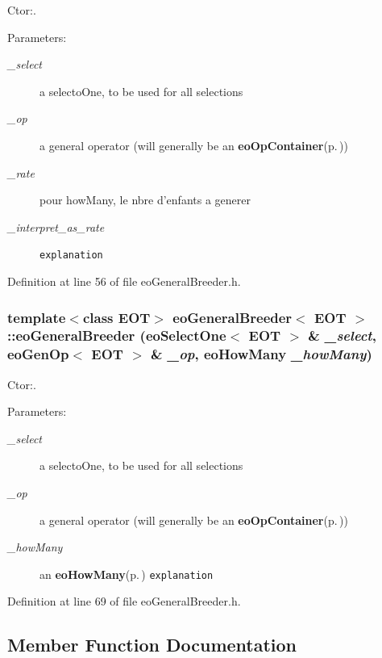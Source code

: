 Ctor:. 

\begin{Desc}
\item[Parameters:]
\begin{description}
\item[{\em \_\-select}]a selecto\-One, to be used for all selections \item[{\em \_\-op}]a general operator (will generally be an {\bf eo\-Op\-Container}{\rm (p.\,\pageref{classeo_op_container})}) \item[{\em \_\-rate}]pour how\-Many, le nbre d'enfants a generer \item[{\em \_\-interpret\_\-as\_\-rate}]{\tt explanation} \end{description}
\end{Desc}


Definition at line 56 of file eo\-General\-Breeder.h.
\subsubsection{\setlength{\rightskip}{0pt plus 5cm}template$<$class EOT$>$ {\bf eo\-General\-Breeder}$<$ {\bf EOT} $>$::{\bf eo\-General\-Breeder} ({\bf eo\-Select\-One}$<$ {\bf EOT} $>$ \& {\em \_\-select}, {\bf eo\-Gen\-Op}$<$ {\bf EOT} $>$ \& {\em \_\-op}, {\bf eo\-How\-Many} {\em \_\-how\-Many})\hspace{0.3cm}{\tt  [inline]}}\label{classeo_general_breeder_a1}


Ctor:. 

\begin{Desc}
\item[Parameters:]
\begin{description}
\item[{\em \_\-select}]a selecto\-One, to be used for all selections \item[{\em \_\-op}]a general operator (will generally be an {\bf eo\-Op\-Container}{\rm (p.\,\pageref{classeo_op_container})}) \item[{\em \_\-how\-Many}]an {\bf eo\-How\-Many}{\rm (p.\,\pageref{classeo_how_many})} {\tt explanation} \end{description}
\end{Desc}


Definition at line 69 of file eo\-General\-Breeder.h.

\subsection{Member Function Documentation}
